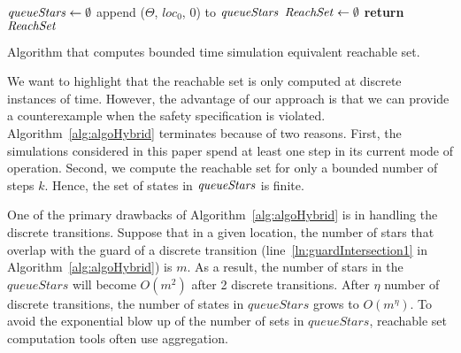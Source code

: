 \begin{algorithm}[h!]
\SetAlgoVlined
{}
${\it queueStars} \gets \emptyset$\; 
append ($\Theta$, $loc_0$, $0$) to ${\it queueStars}$\; 
${\it ReachSet} \gets \emptyset$\;
{\bf return} ${\it ReachSet}$\;
\caption{Algorithm that computes bounded time simulation equivalent reachable set.}
\label{alg:algoHybrid}
\end{algorithm}

We want to highlight that the reachable set is only computed at discrete instances of time.
%
However, the advantage of our approach is that we can provide a counterexample when the safety specification is violated.
%
Algorithm~\ref{alg:algoHybrid} terminates because of two reasons. First, the simulations considered in this paper spend at least one step in its current mode of operation. Second, we compute the reachable set for only a bounded number of steps $k$. Hence, the set of states in ${\it queueStars}$ is finite.

One of the primary drawbacks of Algorithm~\ref{alg:algoHybrid} is in handling the discrete transitions. 
%
Suppose that in a given location, the number of stars that overlap with the guard of a discrete transition (line~\ref{ln:guardIntersection1} in Algorithm~\ref{alg:algoHybrid}) is $m$.
%
As a result, the number of stars in the $queueStars$ will become $O(m^2)$ after 2 discrete transitions. After $\eta$ number of discrete transitions, the number of states in $queueStars$ grows to $O(m^{\eta})$.
%
To avoid the exponential blow up of the number of sets in $queueStars$, reachable set computation tools often use aggregation.

